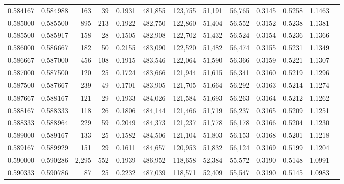 \begin{tabular}{rrrrrrrrrrrrr}
0.584167 & 0.584988 &   163 &  39 &                                     0.1931 & 481,855 & 123,755 &  51,191 &  56,765 & 0.3145 & 0.5258 & 1.1463 \\
0.585000 & 0.585500 &   895 & 213 &                                     0.1922 & 482,750 & 122,860 &  51,404 &  56,552 & 0.3152 & 0.5238 & 1.1381 \\
0.585500 & 0.585917 &   158 &  28 &                                     0.1505 & 482,908 & 122,702 &  51,432 &  56,524 & 0.3154 & 0.5236 & 1.1366 \\
0.586000 & 0.586667 &   182 &  50 &                                     0.2155 & 483,090 & 122,520 &  51,482 &  56,474 & 0.3155 & 0.5231 & 1.1349 \\
0.586667 & 0.587000 &   456 & 108 &                                     0.1915 & 483,546 & 122,064 &  51,590 &  56,366 & 0.3159 & 0.5221 & 1.1307 \\
0.587000 & 0.587500 &   120 &  25 &                                     0.1724 & 483,666 & 121,944 &  51,615 &  56,341 & 0.3160 & 0.5219 & 1.1296 \\
0.587500 & 0.587667 &   239 &  49 &                                     0.1701 & 483,905 & 121,705 &  51,664 &  56,292 & 0.3163 & 0.5214 & 1.1274 \\
0.587667 & 0.588167 &   121 &  29 &                                     0.1933 & 484,026 & 121,584 &  51,693 &  56,263 & 0.3164 & 0.5212 & 1.1262 \\
0.588167 & 0.588333 &   118 &  26 &                                     0.1806 & 484,144 & 121,466 &  51,719 &  56,237 & 0.3165 & 0.5209 & 1.1251 \\
0.588333 & 0.588964 &   229 &  59 &                                     0.2049 & 484,373 & 121,237 &  51,778 &  56,178 & 0.3166 & 0.5204 & 1.1230 \\
0.589000 & 0.589167 &   133 &  25 &                                     0.1582 & 484,506 & 121,104 &  51,803 &  56,153 & 0.3168 & 0.5201 & 1.1218 \\
0.589167 & 0.589929 &   151 &  29 &                                     0.1611 & 484,657 & 120,953 &  51,832 &  56,124 & 0.3169 & 0.5199 & 1.1204 \\
0.590000 & 0.590286 & 2,295 & 552 &                                     0.1939 & 486,952 & 118,658 &  52,384 &  55,572 & 0.3190 & 0.5148 & 1.0991 \\
0.590333 & 0.590786 &    87 &  25 &                                     0.2232 & 487,039 & 118,571 &  52,409 &  55,547 & 0.3190 & 0.5145 & 1.0983 \\

\end{tabular}
